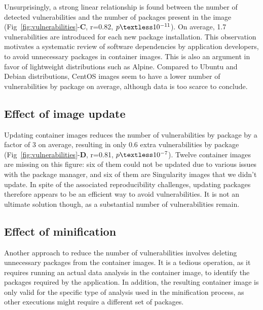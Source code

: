 \documentclass[a4paper,num-refs]{oup-contemporary}
\newcommand{\change}[2]{\color{cyan}Changes: #1\color{black}}
\begin{document}
Unsurprisingly, a strong linear relationship is found between the number of
detected vulnerabilities and the number of packages present in the
image (Fig~\ref{fig:vulnerabilities}-\textbf{C}, r=0.82,
$p\textless10^{-11}$). On average, 1.7 vulnerabilities are introduced for
each new package installation. This observation motivates a systematic
review of software dependencies by application developers, to avoid
unnecessary packages in container images. This is also an argument in favor of lightweight
distributions such as Alpine. Compared to Ubuntu and Debian distributions,
CentOS images seem to have a lower number of vulnerabilities by package on
average, although data is too scarce to conclude.

\subsection{Effect of image update}

Updating container images reduces the number of vulnerabilities by package
by a factor of 3 on average, resulting in only 0.6 extra vulnerabilities by
package (Fig~\ref{fig:vulnerabilities}-\textbf{D}, r=0.81,
$p\textless10^{-7}$). Twelve container images are missing on this figure:
six of them could not be updated due to various issues with the package
manager, and six of them are Singularity images that we didn't update.
In spite of the associated reproducibility challenges, updating
packages therefore appears to be an efficient way to avoid vulnerabilities. It
is not an ultimate solution though, as a substantial number of
vulnerabilities remain.

\subsection{Effect of minification}

Another approach to reduce the number of vulnerabilities involves deleting
unnecessary packages from the container images. It is a tedious operation,
as it requires running an actual data analysis in the container image, to
identify the packages required by the application. In addition, the
resulting container image is only valid for the specific type of analysis
used in the minification process, as other executions might require a
different set of packages. 
\end{document}
